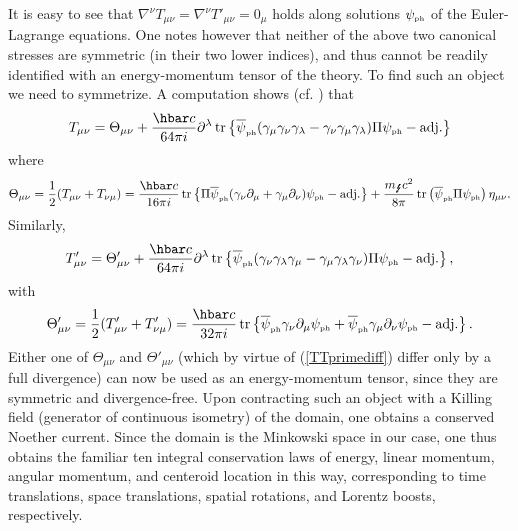 \documentclass[11pt]{article}
\theoremstyle{definition}
\DeclareMathOperator{\tr}{tr}
\newcommand{\refeq}[1]{(\ref{#1})}
\numberwithin{equation}{section}
\newcommand{\beq}{\begin{equation}}
\newcommand{\eeq}{\end{equation}}
\newcommand{\p}{\partial}
\newcommand{\psiPH}{{\psi_{\mbox{\rm\tiny ph}}}}
\newcommand{\psiPHb}{{\overline\psi_{\mbox{\rm\tiny ph}}}}
\newcommand{\mPH}{{m_{\mbox{\Lightning}}}}
\newcommand{\la}{\lambda}
\newcommand{\ga}{\gamma}
\newcommand{\nab}{\nabla}
\newcommand{\half}{\frac{1}{2}}
\begin{document}
It is easy to see that $\nab^\nu T_{\mu\nu} = \nab^\nu T'_{\mu\nu} = 0_\mu$ holds along solutions $\psiPH$ of the Euler-Lagrange equations.
  One notes however that neither of the above two canonical stresses are symmetric (in their two lower indices), and thus cannot be readily 
identified with an energy-momentum tensor of the theory. 
 To find such an object we need to symmetrize. 
 A computation shows (cf. \cite{HC1946}) that
\beq 
T_{\mu\nu} = 
\Theta_{\mu\nu}+\frac{\hbar c}{64 \pi i} \p^\la \tr \left\{ \psiPHb (\ga_\mu\ga_\nu\ga_\la - \ga_\nu\ga_\mu\ga_\la) \Pi\psiPH - \mbox{adj.} \right\}
\eeq
where
\beq 
\Theta_{\mu\nu} = \half (T_{\mu\nu} + T_{\nu\mu}) =
\frac{\hbar c}{16 \pi i} \tr\left\{ \Pi\psiPHb (\ga_\nu \p_\mu + \ga_\mu\p_\nu)\psiPH - \mbox{adj.} \right\} 
+\frac{\mPH c^2}{8 \pi} \tr \left(\psiPHb \Pi\psiPH\right)\eta_{\mu\nu}.
\eeq
Similarly,
\beq 
T'_{\mu\nu} = 
\Theta'_{\mu\nu}+\frac{\hbar c}{64 \pi i} \p^\la \tr\left\{ \psiPHb (\ga_\nu\ga_\la \ga_\mu - \ga_\mu \ga_\la \ga_\nu ) 
\Pi \psiPH - \mbox{adj.} \right\},
\eeq
with 
\beq 
\Theta'_{\mu\nu} = \half( T'_{\mu\nu} + T'_{\nu\mu}) 
= \frac{\hbar c}{32 \pi i} \tr \left\{ \psiPHb \ga_\nu \p_\mu \psiPH + \psiPHb \ga_\mu \p_\nu \psiPH - \mbox{adj.} \right\}.
\eeq
Either one of $\Theta_{\mu\nu}$ and $\Theta'_{\mu\nu}$ (which by virtue of \refeq{TTprimediff} differ only by a full divergence) can 
now be used as an energy-momentum tensor, since they are symmetric and divergence-free. 
 Upon contracting such an object with a Killing field (generator of continuous isometry) of the domain, one obtains a conserved Noether current.
  Since the domain is the Minkowski space in our case, one thus obtains the familiar ten integral conservation laws of energy, linear momentum, 
angular momentum, and centeroid location in this way, corresponding to time translations, space translations, spatial rotations, and Lorentz 
boosts, respectively.  
\end{document}
